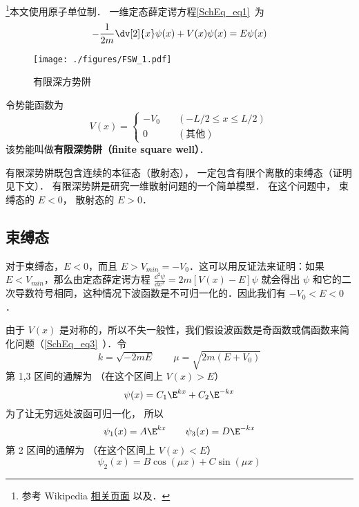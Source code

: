 
\begin{issues}
\issueTODO
\end{issues}




\footnote{参考 Wikipedia \href{https://en.wikipedia.org/wiki/Finite_potential_well}{相关页面} 以及\cite{GriffQ}．}本文使用原子单位制． 一维定态薛定谔方程\autoref{SchEq_eq1}~为
\begin{equation}
-\frac{1}{2m}\dv[2]{x}\psi(x) + V(x) \psi(x) = E \psi(x)
\end{equation}

\begin{figure}[ht]
\centering
\texttt{[image: ./figures/FSW\_1.pdf]}
\caption{有限深方势阱} \label{FSW_fig1}
\end{figure}
令势能函数为
\begin{equation}
V(x) = \begin{cases}
-V_0 \quad &(-L/2 \leqslant x \leqslant L/2)\\
0 \quad &(\text{其他})
\end{cases}
\end{equation}
该势能叫做\textbf{有限深势阱（finite square well）}．

有限深势阱既包含连续的本征态（散射态）， 一定包含有限个离散的束缚态（证明见下文）． 有限深势阱是研究一维散射问题的一个简单模型． 在这个问题中， 束缚态的 $E<0$， 散射态的 $E>0$．

\subsection{束缚态}
对于束缚态，$E<0$，而且 $E> V_{min}=-V_0$．这可以用反证法来证明：如果 $E<V_{min}$，那么由定态薛定谔方程 $\frac{\dd {^2}\psi}{\dd x^2}=2m[V(x)-E]\psi$ 就会得出 $\psi$ 和它的二次导数符号相同，这种情况下波函数是不可归一化的．因此我们有 $-V_0<E<0$．

由于 $V(x)$ 是对称的，所以不失一般性，我们假设波函数是奇函数或偶函数来简化问题（\autoref{SchEq_eq3}~）．令
\begin{equation}\label{FSW_eq4}
k = \sqrt{-2mE} \qquad \mu = \sqrt{2m(E + V_0)}
\end{equation}
第 1,3 区间的通解为 （在这个区间上 $V(x) > E$）
\begin{equation}
\psi(x) = C_1 \E^{kx} + C_2 \E^{-kx}
\end{equation}
为了让无穷远处波函可归一化， 所以
\begin{equation}
\psi_1(x) = A \E^{kx} \qquad \psi_3(x) = D\E^{-kx}
\end{equation}
第 2 区间的通解为 （在这个区间上 $V(x) < E$）
\begin{equation}
\psi_2(x) = B \cos(\mu x) + C\sin(\mu x)
\end{equation}


